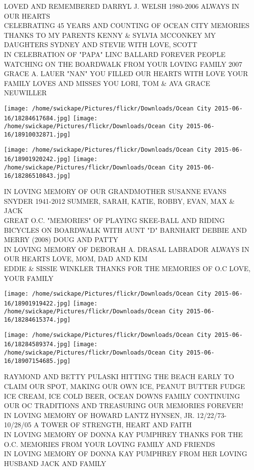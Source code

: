 \documentclass[10pt,letterpaper]{article}
\begin{document}
LOVED AND REMEMBERED DARRYL J. WELSH 1980{-}2006 ALWAYS IN OUR HEARTS\\
CELEBRATING 45 YEARS AND COUNTING OF OCEAN CITY MEMORIES THANKS TO MY PARENTS KENNY \& SYLVIA MCCONKEY MY DAUGHTERS SYDNEY AND STEVIE WITH LOVE, SCOTT\\
IN CELEBRATION OF "PAPA" LINC BALLARD FOREVER PEOPLE WATCHING ON THE BOARDWALK FROM YOUR LOVING FAMILY 2007\\
GRACE A. LAUER "NAN" YOU FILLED OUR HEARTS WITH LOVE YOUR FAMILY LOVES AND MISSES YOU LORI, TOM \& AVA GRACE NEUWILLER\\
\pagebreak

\texttt{[image: /home/swickape/Pictures/flickr/Downloads/Ocean City 2015-06-16/18284617684.jpg]}
\texttt{[image: /home/swickape/Pictures/flickr/Downloads/Ocean City 2015-06-16/18910032871.jpg]}

\texttt{[image: /home/swickape/Pictures/flickr/Downloads/Ocean City 2015-06-16/18901920242.jpg]}
\texttt{[image: /home/swickape/Pictures/flickr/Downloads/Ocean City 2015-06-16/18286510843.jpg]}

IN LOVING MEMORY OF OUR GRANDMOTHER SUSANNE EVANS SNYDER 1941{-}2012 SUMMER, SARAH, KATIE, ROBBY, EVAN, MAX \& JACK\\
GREAT O.C. "MEMORIES" OF PLAYING SKEE{-}BALL AND RIDING BICYCLES ON BOARDWALK WITH AUNT "D" BARNHART DEBBIE AND MERRY (2008) DOUG AND PATTY\\
IN LOVING MEMORY OF DEBORAH A. DRASAL LABRADOR ALWAYS IN OUR HEARTS LOVE, MOM, DAD AND KIM\\
EDDIE \& SISSIE WINKLER THANKS FOR THE MEMORIES OF O.C LOVE, YOUR FAMILY\\
\pagebreak

\texttt{[image: /home/swickape/Pictures/flickr/Downloads/Ocean City 2015-06-16/18901919422.jpg]}
\texttt{[image: /home/swickape/Pictures/flickr/Downloads/Ocean City 2015-06-16/18284615374.jpg]}

\texttt{[image: /home/swickape/Pictures/flickr/Downloads/Ocean City 2015-06-16/18284589374.jpg]}
\texttt{[image: /home/swickape/Pictures/flickr/Downloads/Ocean City 2015-06-16/18907154685.jpg]}

RAYMOND AND BETTY PULASKI HITTING THE BEACH EARLY TO CLAIM OUR SPOT, MAKING OUR OWN ICE, PEANUT BUTTER FUDGE ICE CREAM, ICE COLD BEER, OCEAN  DOWNS FAMILY CONTINUING OUR OC TRADITIONS AND TREASURING OUR MEMORIES FOREVER!\\
IN LOVING MEMORY OF HOWARD LANTZ HYNSEN, JR.  12/22/73{-}10/28/05 A TOWER OF STRENGTH, HEART AND FAITH\\
IN LOVING MEMORY OF DONNA KAY PUMPHREY THANKS FOR THE O.C. MEMORIES FROM YOUR LOVING FAMILY AND FRIENDS\\
IN LOVING MEMORY OF DONNA KAY PUMPHREY FROM HER LOVING HUSBAND JACK AND FAMILY\\
\pagebreak
\end{document}
